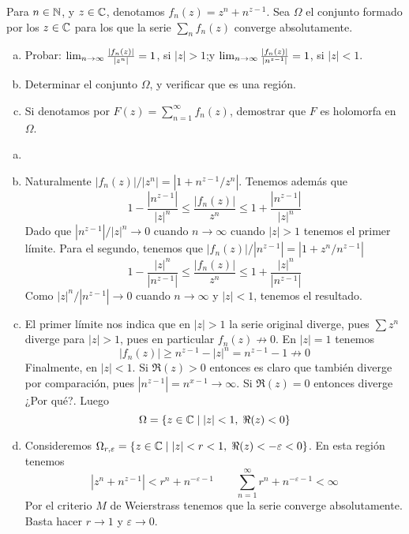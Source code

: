 \documentclass[twoside]{article}
\begin{document}
\newpage
\begin{ejercicio}{6}
Para $n\in\mathbb{N}$, y $z\in\mathbb{C}$, denotamos $f_n(z)=z^n + n^{z-1}$. 
Sea $\Omega$ el conjunto formado por los $z\in\mathbb{C}$ para los que la serie
$\sum_n f_n(z)$ converge absolutamente.
\begin{enumerate}[a)]
\item Probar:  $\lim_{n\to\infty}{|f_n(z)|\over |z^n|}=1$, si $|z|>1$;\quad  y \quad
$\lim_{n\to\infty}{|f_n(z)|\over |n^{z-1}|}=1$, si $|z|<1$.
\item Determinar el conjunto $\Omega$, y verificar que es una
regi\'on.
\item Si denotamos por $F(z)=\sum_{n=1}^\infty f_n(z)$, demostrar que $F$ es holomorfa en $\Omega $.
\end{enumerate}
\end{ejercicio}
\begin{solucion}
\begin{enumerate}[a)]
\item[]
\item Naturalmente $|f_n(z)|/|z^n| = |1 + n^{z-1}/z^n|$. Tenemos además que
$$
1-\frac{|n^{z-1}|}{|z|^n} \leq \frac{|f_n(z)|}{z^n}\leq 1 + \frac{|n^{z-1}|}{|z|^n}
$$
Dado que $|n^{z-1}|/|z|^n\to 0$ cuando $n\to \infty$ cuando $|z|>1$ tenemos el primer límite. Para el segundo, tenemos que $|f_n(z)|/|n^{z-1}| = |1 + z^n/n^{z-1}|$ 
$$
1-\frac{|z|^n}{|n^{z-1}|} \leq \frac{|f_n(z)|}{z^n}\leq 1 + \frac{|z|^n}{|n^{z-1}|}
$$
Como $|z|^n/|n^{z-1}| \to 0$ cuando $n\to \infty$ y $|z|<1$, tenemos el resultado.
\item El primer límite nos indica que en $|z|>1$ la serie original diverge, pues $\sum z^n$ diverge para $|z|>1$, pues en particular $f_n(z) \not \to 0$. En $|z|=1$ tenemos
$$
|f_n(z)| \geq n^{z-1}-|z|^n  = n^{z-1} - 1 \not\to 0
$$ Finalmente, en $|z|<1$. Si $\Re(z)>0$ entonces es claro que también diverge por comparación, pues $|n^{z-1}| = n^{x-1} \to \infty$. Si $\Re(z)=0$ entonces diverge ¿Por qué?. Luego 
$$
\Omega = \{z\in \mathbb{C} \mid |z|<1,\; \Re(z)<0\}
$$
\item Consideremos $\Omega_{r,\varepsilon} = \{z\in \mathbb{C} \mid |z|<r<1,\; \Re(z)<-\varepsilon<0\}$. En esta región tenemos
$$
|z^n+n^{z-1}| < r^n + n^{-\varepsilon-1} \qquad \sum_{n=1}^\infty r^n + n^{-\varepsilon-1} < \infty
$$
Por el criterio $M$ de Weierstrass tenemos que la serie converge absolutamente. Basta hacer $r\to 1$ y $\varepsilon\to 0$.
\end{enumerate}
\end{solucion}
\end{document}
